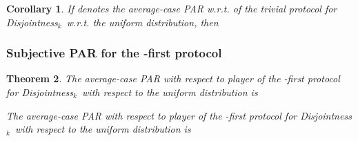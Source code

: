\documentclass{article}
\theoremstyle{theorem}
\newtheorem{theorem}{Theorem}[section]
\newtheorem{cor}[theorem]{Corollary}
\theoremstyle{definition}
\theoremstyle{remark}
\newcommand{\disjoint}{{\sc Dis\-joint\-ness}\ensuremath{_k}}
\begin{document}
\begin{cor}
If  denotes the average-case PAR w.r.t.  of the trivial protocol for \disjoint\ w.r.t. the uniform distribution, then

\end{cor}

\subsubsection{Subjective PAR for the -first protocol}

\begin{theorem}
The average-case PAR with respect to player  of the -first protocol for \disjoint\ with respect to the uniform distribution is

The average-case PAR with respect to player  of the -first protocol for \disjoint\ with respect to the uniform distribution is

\end{theorem}
\end{document}

